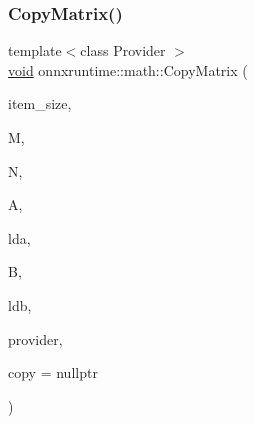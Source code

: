 \mbox{\label{namespaceonnxruntime_1_1math_aad70b3106415e3f15f8486445c356efc}} 
\subsubsection{\texorpdfstring{Copy\+Matrix()}{CopyMatrix()}}
{\footnotesize\ttfamily template$<$class Provider $>$ \\
\mbox{\hyperlink{mlasi_8h_a88f941d423cb2a819b70a1358982b1a6}{void}} onnxruntime\+::math\+::\+Copy\+Matrix (\begin{DoxyParamCaption}\item[{const \mbox{\hyperlink{mlasi_8h_a503efbc1c6e50825320ad909366b78ab}{size\+\_\+t}}}]{item\+\_\+size,  }\item[{const int}]{M,  }\item[{const int}]{N,  }\item[{const \mbox{\hyperlink{mlasi_8h_a88f941d423cb2a819b70a1358982b1a6}{void}} $\ast$}]{A,  }\item[{const int}]{lda,  }\item[{\mbox{\hyperlink{mlasi_8h_a88f941d423cb2a819b70a1358982b1a6}{void}} $\ast$}]{B,  }\item[{const int}]{ldb,  }\item[{Provider $\ast$}]{provider,  }\item[{\mbox{\hyperlink{namespaceonnxruntime_1_1math_a4fd61c06d9e9e1bc3ceb526787eab4e7}{Typed\+Copy}}}]{copy = {\ttfamily nullptr} }\end{DoxyParamCaption})}

\mbox{\label{namespaceonnxruntime_1_1math_a0cdbbd78e474c1bbbfae1e907f5b42be}} 
